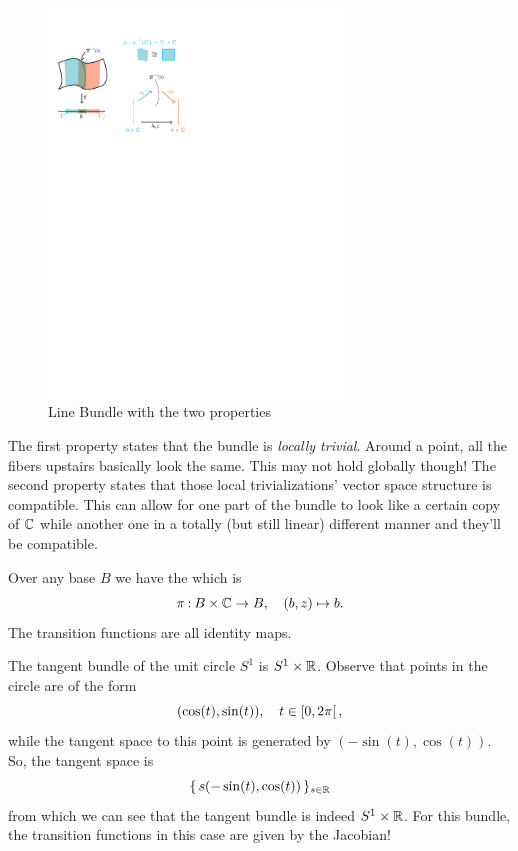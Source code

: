 \documentclass[12pt]{memoir}
\begin{document}
    \begin{figure}[h!]
        \centering
        \includegraphics[width=0.7\textwidth, trim= 0.725cm 19.25cm 11.625cm 2.25cm,clip]{../figs/figLineBundleDefn.pdf}
        \caption{Line Bundle with the two properties}
        \label{fig:1-LineBdlExample}
    \end{figure} 

    The first property states that the bundle is \emph{locally trivial}. Around a point, all the fibers upstairs basically look the same. This may not hold globally though! The second property states that those local trivializations' vector space structure is compatible. This can allow for one part of the bundle to look like a certain copy of $\mathbb{C}$ while another one in a totally (but still linear) different manner and they'll be compatible.

    \begin{Ex}
    Over any base $B$ we have the  which is 
    $$\pi\mathbin{:} B\times\mathbb{C}\to B,\quad (b,z)\mapsto b.$$
    The transition functions are all identity maps.
    \end{Ex} 

    \begin{Ex}
        The tangent bundle of the unit circle $S^1$ is $S^1\times\mathbb{R}$. Observe that points in the circle are of the form 
        $$(\cos(t),\sin(t)),\quad t\in\left\lbrack0,2\pi\right\lbrack,$$
        while the tangent space to this point is generated by $(-\sin(t),\cos(t))$. So, the tangent space is 
        $$\{\,s(-\sin(t),\cos(t))\,\}_{s\in\mathbb{R}}$$
        from which we can see that the tangent bundle is indeed $S^1\times\mathbb{R}$. For this bundle, the transition functions in this case are given by the Jacobian!
    \end{Ex}
\end{document}
